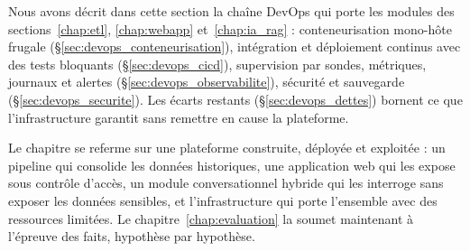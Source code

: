 Nous avons décrit dans cette section la chaîne DevOps qui porte les modules des sections~\ref{chap:etl}, \ref{chap:webapp} et~\ref{chap:ia_rag} : conteneurisation mono-hôte frugale (\S\ref{sec:devops_conteneurisation}), intégration et déploiement continus avec des tests bloquants (\S\ref{sec:devops_cicd}), supervision par sondes, métriques, journaux et alertes (\S\ref{sec:devops_observabilite}), sécurité et sauvegarde (\S\ref{sec:devops_securite}). Les écarts restants (\S\ref{sec:devops_dettes}) bornent ce que l'infrastructure garantit sans remettre en cause la plateforme.

Le chapitre se referme sur une plateforme construite, déployée et exploitée : un pipeline qui consolide les données historiques, une application web qui les expose sous contrôle d'accès, un module conversationnel hybride qui les interroge sans exposer les données sensibles, et l'infrastructure qui porte l'ensemble avec des ressources limitées. Le chapitre~\ref{chap:evaluation} la soumet maintenant à l'épreuve des faits, hypothèse par hypothèse.
